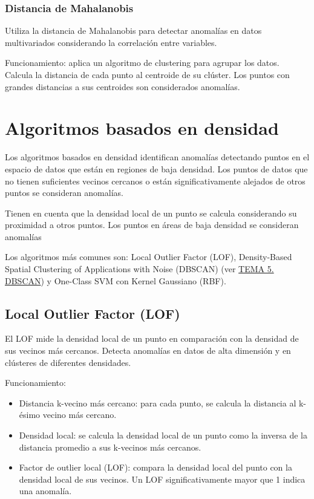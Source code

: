 \subsubsection{Distancia de Mahalanobis}

Utiliza la distancia de Mahalanobis para detectar anomalías en datos multivariados considerando la correlación entre variables.

Funcionamiento: aplica un algoritmo de clustering para agrupar los datos. Calcula la distancia de cada punto al centroide de su clúster. Los puntos con grandes distancias a sus centroides son considerados anomalías.


\section{Algoritmos basados en densidad}
Los algoritmos basados en densidad identifican anomalías detectando puntos en el espacio de datos que están en regiones de baja densidad. Los puntos de datos que no tienen suficientes vecinos cercanos o están significativamente alejados de otros puntos se consideran anomalías.

Tienen en cuenta que la densidad local de un punto se calcula considerando su proximidad a otros puntos. Los puntos en áreas de baja densidad se consideran anomalías

 Los algoritmos más comunes son: Local Outlier Factor (LOF), Density-Based Spatial Clustering of Applications with Noise (DBSCAN) (ver \hyperref[TEMA5]{TEMA 5. DBSCAN}) y One-Class SVM con Kernel Gaussiano (RBF).

\subsection{Local Outlier Factor (LOF)}
El LOF mide la densidad local de un punto en comparación con la densidad de sus vecinos más cercanos. Detecta anomalías en datos de alta dimensión y en clústeres de diferentes densidades.

Funcionamiento:  

\begin{itemize}
    \item  Distancia k-vecino más cercano: para cada punto, se calcula la distancia al k-ésimo vecino más cercano.
    \item Densidad local: se calcula la densidad local de un punto como la inversa de la distancia promedio a sus k-vecinos más cercanos.
 
    \item Factor de outlier local (LOF): compara la densidad local del punto con la densidad local de sus vecinos. Un LOF significativamente mayor que 1 indica una anomalía.
\end{itemize}

